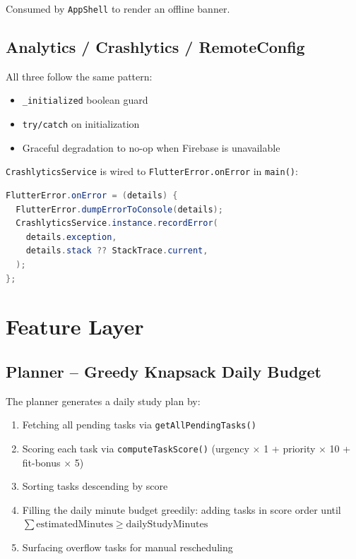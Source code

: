 \documentclass[12pt,a4paper,openany]{report}
\begin{document}
Consumed by \texttt{AppShell} to render an offline banner.

\subsection{Analytics / Crashlytics / RemoteConfig}

All three follow the same pattern:
\begin{itemize}[leftmargin=*]
  \item \texttt{\_initialized} boolean guard
  \item \texttt{try/catch} on initialization
  \item Graceful degradation to no-op when Firebase is unavailable
\end{itemize}

\texttt{CrashlyticsService} is wired to \texttt{FlutterError.onError} in \texttt{main()}:
\begin{lstlisting}[language=Java]
FlutterError.onError = (details) {
  FlutterError.dumpErrorToConsole(details);
  CrashlyticsService.instance.recordError(
    details.exception,
    details.stack ?? StackTrace.current,
  );
};
\end{lstlisting}

\section{Feature Layer}

\subsection{Planner -- Greedy Knapsack Daily Budget}

The planner generates a daily study plan by:

\begin{enumerate}[leftmargin=*]
  \item Fetching all pending tasks via \texttt{getAllPendingTasks()}
  \item Scoring each task via \texttt{computeTaskScore()} (urgency $\times$ 1 + priority $\times$ 10 + fit-bonus $\times$ 5)
  \item Sorting tasks descending by score
  \item Filling the daily minute budget greedily: adding tasks in score order until $\sum \text{estimatedMinutes} \ge \text{dailyStudyMinutes}$
  \item Surfacing overflow tasks for manual rescheduling
\end{enumerate}
\end{document}
